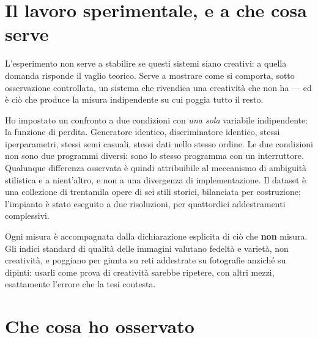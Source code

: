 \documentclass[10pt,a4paper]{article}
\begin{document}
\section{Il lavoro sperimentale, e a che cosa serve}

L'esperimento non serve a stabilire se questi sistemi siano creativi: a quella domanda risponde il vaglio teorico.
Serve a mostrare come si comporta, sotto osservazione controllata, un sistema che rivendica una creatività che non ha --- ed è ciò che produce la misura indipendente su cui poggia tutto il resto.

Ho impostato un confronto a due condizioni con \emph{una sola} variabile indipendente: la funzione di perdita.
Generatore identico, discriminatore identico, stessi iperparametri, stessi semi casuali, stessi dati nello stesso ordine.
Le due condizioni non sono due programmi diversi: sono lo stesso programma con un interruttore.
Qualunque differenza osservata è quindi attribuibile al meccanismo di ambiguità stilistica e a nient'altro, e non a una divergenza di implementazione.
Il dataset è una collezione di trentamila opere di sei stili storici, bilanciata per costruzione; l'impianto è stato eseguito a due risoluzioni, per quattordici addestramenti complessivi.

Ogni misura è accompagnata dalla dichiarazione esplicita di ciò che \textbf{non} misura.
Gli indici standard di qualità delle immagini valutano fedeltà e varietà, non creatività, e poggiano per giunta su reti addestrate su fotografie anziché su dipinti: usarli come prova di creatività sarebbe ripetere, con altri mezzi, esattamente l'errore che la tesi contesta.

\section{Che cosa ho osservato}
\end{document}
